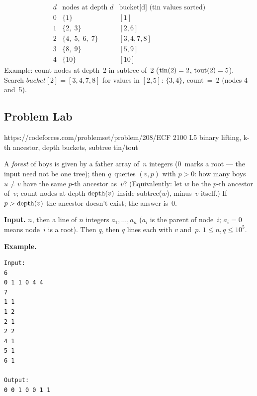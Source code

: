 \begin{tracebox}
\[
\renewcommand{\arraystretch}{1.2}
\begin{array}{c|l|l}
d & \text{nodes at depth } d & \text{bucket[d] (tin values sorted)} \\ \hline
0 & \{1\} & [1] \\
1 & \{2,\;3\} & [2, 6] \\
2 & \{4,\;5,\;6,\;7\} & [3, 4, 7, 8] \\
3 & \{8,\;9\} & [5, 9] \\
4 & \{10\} & [10]
\end{array}
\]
Example: count nodes at depth~2 in subtree of~2
(\(\operatorname{tin}(2)=2\), \(\operatorname{tout}(2)=5\)).  Search \(\mathit{bucket}[2]=[3,4,7,8]\)
for values in \([2,5]\): \(\{3,4\}\), count~=~2 (nodes 4 and~5).  \checkmark
\end{tracebox}

\subsection{Problem Lab}

  {https://codeforces.com/problemset/problem/208/E}{CF 2100 L5}
  {binary lifting, k-th ancestor, depth buckets, subtree tin/tout}

\begin{problemstatement}
A \emph{forest} of boys is given by a father array of~$n$ integers
($0$~marks a root --- the input need not be one tree); then $q$~queries
$(v, p)$ with $p > 0$: how many boys $u \ne v$ have the same
$p$-th ancestor as~$v$?  (Equivalently: let $w$ be the $p$-th
ancestor of~$v$; count nodes at depth $\operatorname{depth}(v)$ inside subtree($w$),
minus~$v$ itself.)  If $p > \operatorname{depth}(v)$ the ancestor doesn't exist;
the answer is~$0$.

\textbf{Input.} $n$, then a line of $n$ integers $a_1, \ldots, a_n$
($a_i$ is the parent of node~$i$; $a_i = 0$ means node~$i$ is a root).
Then $q$, then $q$ lines each with $v$ and~$p$.
$1 \le n, q \le 10^5$.

\textbf{Example.}
\begin{verbatim}
Input:
6
0 1 1 0 4 4
7
1 1
1 2
2 1
2 2
4 1
5 1
6 1

Output:
0 0 1 0 0 1 1
\end{verbatim}
\end{problemstatement}


